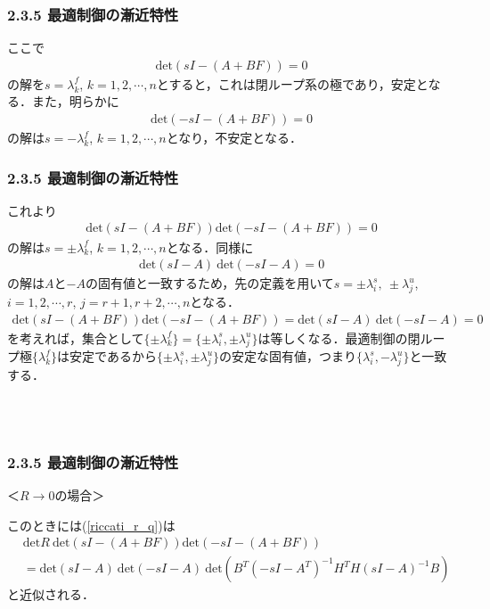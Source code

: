 \begin{frame}[t]
\frametitle{2.3.5 最適制御の漸近特性}
ここで
\begin{align}
	\mbox{det}({sI-(A + B F)})=0
\nonumber
\end{align}
の解を$s= \lambda^f_k$, $k=1,2,\cdots,n$とすると，これは閉ループ系の極であり，安定となる．また，明らかに
\begin{align}
	\mbox{det}({-sI-(A + B F)})=0
\nonumber
\end{align}
の解は$s= -\lambda^f_k$, $k=1,2,\cdots,n$となり，不安定となる．
\end{frame}

\begin{frame}[t]
\frametitle{2.3.5 最適制御の漸近特性}
これより
\begin{align}
	\mbox{det}({sI-(A + B F)})\mbox{det}({-sI-(A + B F)})=0
\end{align}
の解は$ s= \pm \lambda^f_k$, $k=1,2,\cdots,n$となる．同様に
\begin{align}
		 \mbox{det}(sI-A) \ \mbox{det}(-sI-A) =0
\nonumber 
\end{align}
の解は$A$と$-A$の固有値と一致するため，先の定義を用いて$ s= \pm \lambda^s_i, \ \pm \lambda^u_j$, $i=1,2,\cdots,r$, $j=r+1,r+2, \cdots, n$となる．
\begin{align}
	\mbox{det}({sI-(A + B F)})\mbox{det}({-sI-(A + B F)})
		= \mbox{det}(sI-A) \ \mbox{det}(-sI-A) =0 
\nonumber 
\end{align}
を考えれば，集合として$ \{\pm \lambda^f_k\} = \{\pm \lambda^s_i, \pm \lambda^u_j\} $は等しくなる．最適制御の閉ループ極$\{\lambda^f_k\}$は安定であるから$\{\pm \lambda^s_i, \pm \lambda^u_j\} $の安定な固有値，つまり$\{\lambda^s_i, -\lambda^u_j\} $と一致する．

\ \\\
\end{frame}

\begin{frame}[t]
\frametitle{2.3.5 最適制御の漸近特性}
＜$R \rightarrow 0$の場合＞

このときには(\ref{riccati_r_q})は
\begin{align}
	& %
	\mbox{det}R \ \mbox{det}({sI-(A + B F)})\mbox{det}({-sI-(A + B F)})
\nonumber \\
		&= \mbox{det}(sI-A) \ \mbox{det}(-sI-A) \ 
			\mbox{det}( B^T (-sI - A^T)^{-1}H^T H (sI - A)^{-1} B)
\end{align}
と近似される．
\end{frame}

